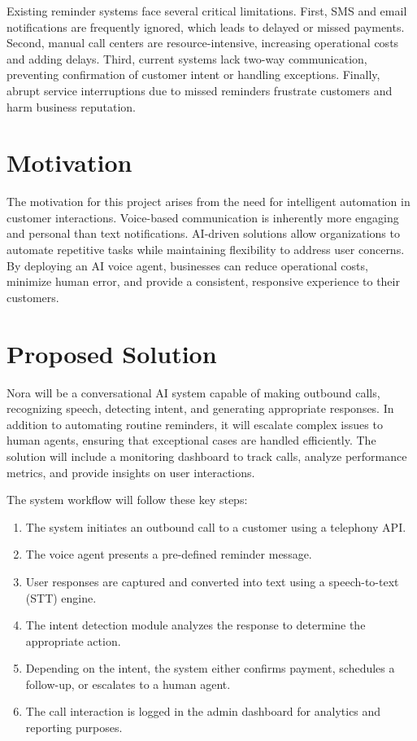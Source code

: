 \documentclass[12pt,a4paper]{report}
\begin{document}
Existing reminder systems face several critical limitations. First, SMS and email notifications are frequently ignored, which leads to delayed or missed payments. Second, manual call centers are resource-intensive, increasing operational costs and adding delays. Third, current systems lack two-way communication, preventing confirmation of customer intent or handling exceptions. Finally, abrupt service interruptions due to missed reminders frustrate customers and harm business reputation.

\section{Motivation}

The motivation for this project arises from the need for intelligent automation in customer interactions. Voice-based communication is inherently more engaging and personal than text notifications. AI-driven solutions allow organizations to automate repetitive tasks while maintaining flexibility to address user concerns. By deploying an AI voice agent, businesses can reduce operational costs, minimize human error, and provide a consistent, responsive experience to their customers.

\section{Proposed Solution}

Nora will be a conversational AI system capable of making outbound calls, recognizing speech, detecting intent, and generating appropriate responses. In addition to automating routine reminders, it will escalate complex issues to human agents, ensuring that exceptional cases are handled efficiently. The solution will include a monitoring dashboard to track calls, analyze performance metrics, and provide insights on user interactions.

The system workflow will follow these key steps:

\begin{enumerate}[itemsep=10pt] %
    \item The system initiates an outbound call to a customer using a telephony API.
    
    \item The voice agent presents a pre-defined reminder message.
    
    \item User responses are captured and converted into text using a speech-to-text (STT) engine.
    
    \item The intent detection module analyzes the response to determine the appropriate action.
    
    \item Depending on the intent, the system either confirms payment, schedules a follow-up, or escalates to a human agent.
    
    \item The call interaction is logged in the admin dashboard for analytics and reporting purposes.
\end{enumerate}
\end{document}
